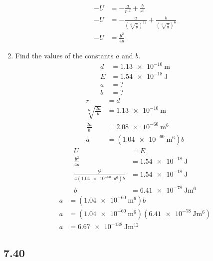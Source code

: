 \documentclass{article}
\begin{document}
\begin{enumerate}[label = \textbf{(\alph*)}]
		\begin{align*}
			-U & = -\frac{a}{r^{12}} + \frac{b}{r^6} \\
			-U & = -\frac{a}{(\sqrt[6]{ \frac{a}{b} })^{12}} + \frac{b}{(\sqrt[6]{ \frac{a}{b} })^6} \\
			-U & = \frac{b^2}{4a}
		\end{align*}
	\item Find the values of the constants $ a $ and $ b $.
		\begin{align*}
			d & = \SI{1.13e-10}{\meter} \\
			E & = \SI{1.54e-18}{\joule} \\
			a & = ? \\
			b & = ?
		\end{align*}
		\begin{align*}
			r & = d \\
			\sqrt[6]{ \frac{2a}{b} } & = \SI{1.13e-10}{\meter} \\
			\frac{2a}{b} & = \SI{2.08e-60}{\meter \tothe 6} \\
			a & = (\SI{1.04e-60}{\meter \tothe 6})b
		\end{align*}
		\begin{align*}
			U & = E \\
			\frac{b^2}{4a} & = \SI{1.54e-18}{\joule} \\
			\frac{b^2}{4(\SI{1.04e-60}{\meter \tothe 6})b} & = \SI{1.54e-18}{\joule} \\
			b & = \SI{6.41e-78}{\joule \meter \tothe 6}
		\end{align*}
		\begin{align*}
			a & = (\SI{1.04e-60}{\meter \tothe 6})b \\
			a & = (\SI{1.04e-60}{\meter \tothe 6})(\SI{6.41e-78}{\joule \meter \tothe 6}) \\
			a & = \SI{6.67e-138}{\joule \meter \tothe {12}}
		\end{align*}
\end{enumerate}

\subsection{7.40}
\end{document}
